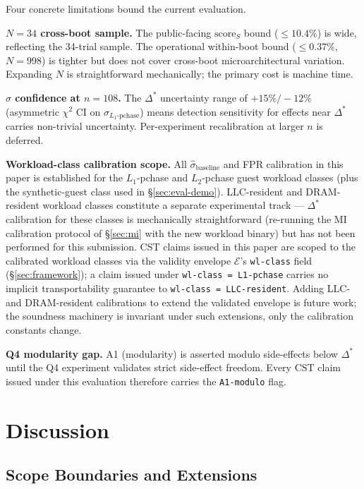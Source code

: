 \documentclass[conference]{IEEEtran}
\newcommand{\sigbase}{\hat{\sigma}_\text{baseline}}
\newcommand{\Dstar}{\Delta^{*}}
\newcommand{\scoreS}{\text{score}_S}
\begin{document}
Four concrete limitations bound the current evaluation.

\textbf{$N{=}34$ cross-boot sample.} The public-facing $\scoreS$
bound ($\leq 10.4\%$) is wide, reflecting the 34-trial sample. The
operational within-boot bound ($\leq 0.37\%$, $N{=}998$) is tighter
but does not cover cross-boot microarchitectural variation.
Expanding $N$ is straightforward mechanically; the primary cost is
machine time.

\textbf{$\hat{\sigma}$ confidence at $n{=}108$.} The $\Dstar$
uncertainty range of $+15\%/{-}12\%$ (asymmetric $\chi^2$ CI on
$\hat{\sigma}_{L_1\text{-pchase}}$) means detection sensitivity for
effects near $\Dstar$ carries non-trivial uncertainty. Per-experiment
recalibration at larger $n$ is deferred.

\textbf{Workload-class calibration scope.} All $\sigbase$ and FPR
calibration in this paper is established for the $L_1$-pchase and
$L_2$-pchase guest workload classes (plus the synthetic-guest
class used in \S\ref{sec:eval-demo}). LLC-resident and
DRAM-resident workload classes constitute a separate experimental
track --- $\Dstar$ calibration for these classes is mechanically
straightforward (re-running the MI calibration protocol of
\S\ref{sec:mi} with the new workload binary) but has not been
performed for this submission. CST claims issued in this paper
are scoped to the calibrated workload classes via the validity
envelope $\mathcal{E}$'s \texttt{wl-class} field
(\S\ref{sec:framework}); a claim issued under
\texttt{wl-class = L1-pchase} carries no implicit transportability
guarantee to \texttt{wl-class = LLC-resident}. Adding LLC- and
DRAM-resident calibrations to extend the validated envelope is
future work; the soundness machinery is invariant under such
extensions, only the calibration constants change.

\textbf{Q4 modularity gap.} A1 (modularity) is asserted modulo
side-effects below $\Dstar$ until the Q4 experiment validates strict
side-effect freedom. Every CST claim issued under this evaluation
therefore carries the \texttt{A1-modulo} flag.

\section{Discussion}\label{sec:discussion}

\subsection{Scope Boundaries and Extensions}\label{sec:discussion-scope}
\end{document}
